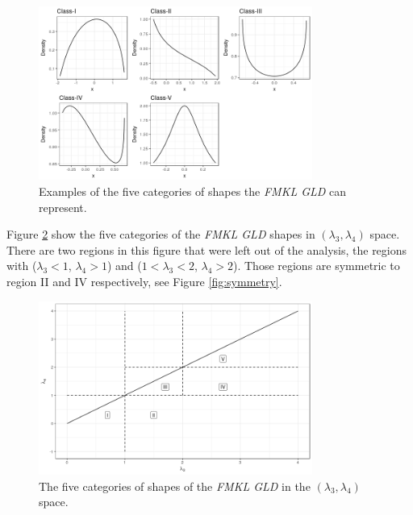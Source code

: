 \begin{figure}[H]
    \centering
    \includegraphics[width=0.8\textwidth]{img/gld/fmkl_classes.png}
    \caption{Examples of the five categories of shapes the \textit{FMKL GLD} can represent.}
    \label{fig:fmkl_classes}
\end{figure}

Figure \ref{fig:fmkl_classes_l3_l4} show the five categories of the \textit{FMKL GLD} shapes in $(\lambda_{3}, \lambda_{4})$ space. There are two regions in this figure that were left out of the analysis, the regions with ($\lambda_{3}<1$, $\lambda_{4}>1$) and ($1<\lambda_{3}<2$, $\lambda_{4}>2$). Those regions are symmetric to region II and IV respectively, see Figure \ref{fig:symmetry}.

\begin{figure}[H]
    \centering
    \includegraphics[width=0.8\textwidth]{img/gld/classes_l3_l4.png}
    \caption{The five categories of shapes of the \textit{FMKL GLD} in the $(\lambda_{3}, \lambda_{4})$ space.}
    \label{fig:fmkl_classes_l3_l4}
\end{figure}

